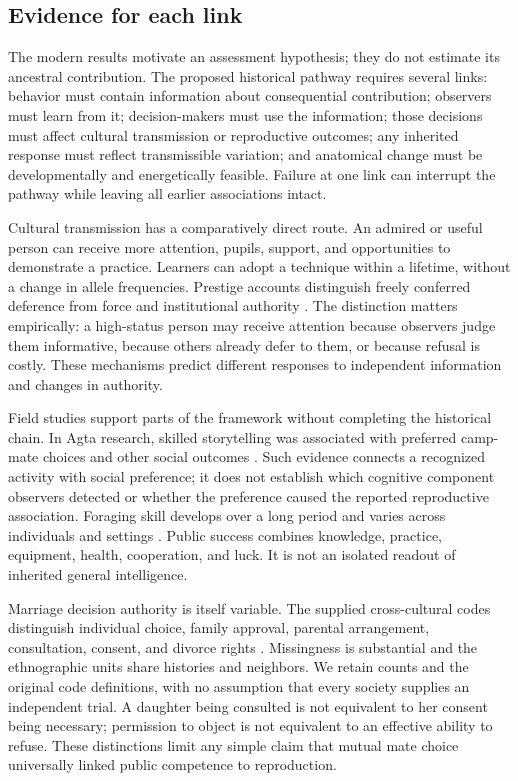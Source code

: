 \subsection{Evidence for each link}

The modern results motivate an assessment hypothesis; they do not estimate its ancestral contribution. The proposed historical pathway requires several links: behavior must contain information about consequential contribution; observers must learn from it; decision-makers must use the information; those decisions must affect cultural transmission or reproductive outcomes; any inherited response must reflect transmissible variation; and anatomical change must be developmentally and energetically feasible. Failure at one link can interrupt the pathway while leaving all earlier associations intact.

Cultural transmission has a comparatively direct route. An admired or useful person can receive more attention, pupils, support, and opportunities to demonstrate a practice. Learners can adopt a technique within a lifetime, without a change in allele frequencies. Prestige accounts distinguish freely conferred deference from force and institutional authority \citep{henrich}. The distinction matters empirically: a high-status person may receive attention because observers judge them informative, because others already defer to them, or because refusal is costly. These mechanisms predict different responses to independent information and changes in authority.

Field studies support parts of the framework without completing the historical chain. In Agta research, skilled storytelling was associated with preferred camp-mate choices and other social outcomes \citep{story}. Such evidence connects a recognized activity with social preference; it does not establish which cognitive component observers detected or whether the preference caused the reported reproductive association. Foraging skill develops over a long period and varies across individuals and settings \citep{koster}. Public success combines knowledge, practice, equipment, health, cooperation, and luck. It is not an isolated readout of inherited general intelligence.

Marriage decision authority is itself variable. The supplied cross-cultural codes distinguish individual choice, family approval, parental arrangement, consultation, consent, and divorce rights \citep{kirby2016,broude1983,frayser1985,whyte1978}. Missingness is substantial and the ethnographic units share histories and neighbors. We retain counts and the original code definitions, with no assumption that every society supplies an independent trial. A daughter being consulted is not equivalent to her consent being necessary; permission to object is not equivalent to an effective ability to refuse. These distinctions limit any simple claim that mutual mate choice universally linked public competence to reproduction.

